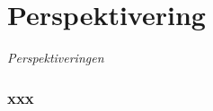 \chapter{Perspektivering}
\label{sec:Perspektivering}

\textit{Perspektiveringen}

\subsection*{xxx}